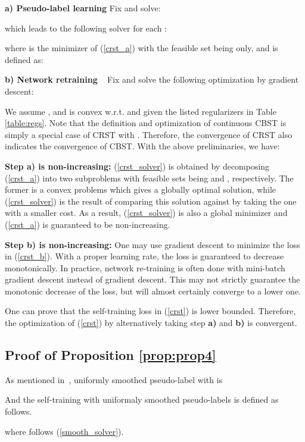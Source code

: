 \documentclass[10pt,twocolumn,letterpaper]{article}
\theoremstyle{plain}
\begin{document}
\noindent \textbf{a) Pseudo-label learning} \label{a)} Fix  and solve:

which leads to the following solver for each :

where  is the minimizer of (\ref{crst_a}) with the feasible set being  only, and  is defined as:


\noindent\textbf{b) Network retraining} \label{b)} ~ Fix  and solve the following optimization by gradient descent:


We assume , and  is convex w.r.t.  and  given the listed regularizers in Table \ref{table:regs}. Note that the definition and optimization of continuous CBST is simply a special case of CRST with . Therefore, the convergence of CRST also indicates the convergence of CBST. With the above preliminaries, we have:

\noindent\textbf{Step a) is non-increasing:} (\ref{crst_solver}) is obtained by decomposing (\ref{crst_a}) into two subproblems with feasible sets being  and , respectively. The former is a convex problems which gives a globally optimal solution, while (\ref{crst_solver}) is the result of comparing this solution against  by taking the one with a smaller cost. As a result, (\ref{crst_solver}) is also a global minimizer and (\ref{crst_a}) is guaranteed to be non-increasing.

\noindent\textbf{Step b) is non-increasing:} One may use gradient descent to minimize the loss in (\ref{crst_b}). With a proper learning rate, the loss is guaranteed to decrease monotonically. In practice, network re-training is often done with mini-batch gradient descent instead of gradient descent. This may not strictly guarantee the monotonic decrease of the loss, but will almost certainly converge to a lower one.

One can prove that the self-training loss in (\ref{crst}) is lower bounded. Therefore, the optimization of (\ref{crst}) by alternatively taking step \textbf{a)} and \textbf{b)} is convergent.

\subsection{Proof of Proposition \ref{prop:prop4}}\label{sec:proofprop4}
As mentioned in~\cite{szegedy2016rethinking}, uniformly smoothed pseudo-label  with  is

And the self-training with uniformaly smoothed pseudo-labels is defined as follows.

where  follows (\ref{smooth_solver}). 
	
\end{document}
